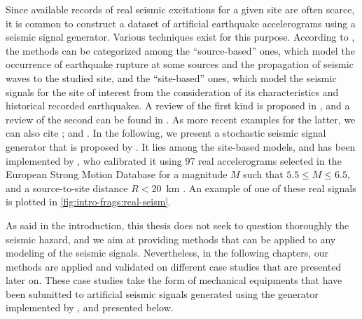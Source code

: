 


Since available records of real seismic excitations for a given site are often scarce, it is common to construct a dataset of artificial earthquake accelerograms using a seismic signal generator.
Various techniques exist for this purpose. According to \citet{rezaeian_stochastic_2008}, the methods can be categorized among the ``source-based'' ones, which model the occurrence of
earthquake rupture at some sources and the propagation of seismic waves to the studied site, and the ``site-based'' ones, which model the seismic signals for the site of interest from the consideration of its characteristics and historical recorded earthquakes.
A review of the first kind is proposed in \cite{zerva_seismic_1988}, and a review of the second can be found in \cite{shinozuka_stochastic_1988}.
As more recent examples for the latter, we can also cite \cite{trevlopoulos_parametric_2019}; and \cite{zentner_enrichment_2012}.
In the following, we present a stochastic seismic signal generator that is proposed by \citet{rezaeian_simulation_2010}. It lies among the site-based models, and has been implemented by \citet{sainct_efficient_2020}, who calibrated it using $97$ real accelerograms selected in the European Strong Motion Database  for a magnitude $M$ such that $5.5 \leq M \leq 6.5$, and a source-to-site distance $R < 20$~km \citep{ambraseys_dissemination_2000}.  An example of one of these real signals is plotted in 
\cref{fig:intro-frags:real-seism}.




As said in the introduction, this thesis does not seek to question thoroughly the seismic hazard, and we aim at providing methods that can be applied to any modeling of the seismic signals. Nevertheless, in the following chapters, our methods are applied and validated on different case studies that are presented later on. These case studies take the form of mechanical equipments that have been submitted to artificial seismic signals generated using the generator implemented by \citet{sainct_efficient_2020}, and presented below.


